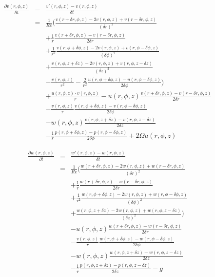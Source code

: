 \documentclass[12pt, a4paper, twoside]{article}
\begin{document}
		\begin{eqnarray}
			\frac{\partial v(r,\phi,z)}{\partial t} &=& \frac{v'(r,\phi,z)- v(r,\phi,z)}{\delta t}
			\nonumber \\
			&=& \frac{1}{Re} \bigg( \frac{v(r+\delta r,\phi,z)-2v(r,\phi,z)+v(r-\delta r,\phi,z)}{(\delta r)^2}
			\nonumber \\
							&&	+ \frac{1}{r}\frac{v(r+\delta r,\phi,z)-v(r-\delta r,\phi,z)}{2\delta r}
			\nonumber \\
							&&	+ \frac{1}{r^2}\frac{v(r,\phi+\delta\phi,z)-2v(r,\phi,z)+v(r,\phi-\delta\phi,z)}{(\delta \phi)^2}
			\nonumber \\
							&&	+ \frac{v(r,\phi,z+\delta z)-2v(r,\phi,z)+v(r,\phi,z-\delta z)}{(\delta z)^2}
			\nonumber \\
							&&	- \frac{v(r,\phi, z)}{r^2}
								- \frac{2}{r^2}\frac{u(r,\phi+\delta\phi,z)-u(r,\phi-\delta\phi,z)}{2\delta\phi} \bigg)
			\nonumber \\
			&&	+ \frac{u(r,\phi,z)\cdot v(r,\phi,z)}{r}
				- u(r,\phi,z)\frac{v(r+\delta r,\phi,z)-v(r-\delta r,\phi,z)}{2\delta r}
			\nonumber \\
			&&	- \frac{v(r,\phi,z)}{r}\frac{v(r,\phi+\delta\phi,z)-v(r,\phi-\delta\phi,z)}{2\delta\phi}
			\nonumber \\
			&&	- w(r,\phi,z)\frac{v(r,\phi,z+\delta z)-v(r,\phi,z-\delta z)}{2\delta z}
			\nonumber \\
			&&	- \frac{1}{r}\frac{p(r,\phi+\delta\phi, z)-p(r,\phi-\delta\phi,z)}{2\delta \phi}
				+ 2\Omega u(r,\phi,z)
			\label{eq:discrete v}
		\end{eqnarray}
		
		\begin{eqnarray}
			\frac{\partial w(r,\phi,z)}{\partial t} &=& \frac{w'(r,\phi,z)- w(r,\phi,z)}{\delta t}
			\nonumber \\
			&=& \frac{1}{Re} \bigg( \frac{w(r+\delta r,\phi,z)-2w(r,\phi,z)+w(r-\delta r,\phi,z)}{(\delta r)^2}
			\nonumber \\
							&&	+ \frac{1}{r}\frac{w(r+\delta r,\phi,z)-w(r-\delta r,\phi,z)}{2\delta r}
			\nonumber \\
							&&	+ \frac{1}{r^2}\frac{w(r,\phi+\delta\phi,z)-2w(r,\phi,z)+w(r,\phi-\delta\phi,z)}{(\delta \phi)^2}
			\nonumber \\
							&&	+ \frac{w(r,\phi,z+\delta z)-2w(r,\phi,z)+w(r,\phi,z-\delta z)}{(\delta z)^2} \bigg)
			\nonumber \\
			&&	- u(r,\phi,z)\frac{w(r+\delta r,\phi,z)-w(r-\delta r,\phi,z)}{2\delta r}
			\nonumber \\
			&&	- \frac{v(r,\phi,z)}{r}\frac{w(r,\phi+\delta\phi,z)-w(r,\phi-\delta\phi,z)}{2\delta\phi}
			\nonumber \\
			&&	- w(r,\phi,z)\frac{w(r,\phi,z+\delta z)-w(r,\phi,z-\delta z)}{2\delta z}
			\nonumber \\
			&&	- \frac{1}{r}\frac{p(r,\phi,z+\delta z)-p(r,\phi,z-\delta z)}{2\delta z}
				- g
			\label{eq:discrete w}
		\end{eqnarray}
		
\end{document}
